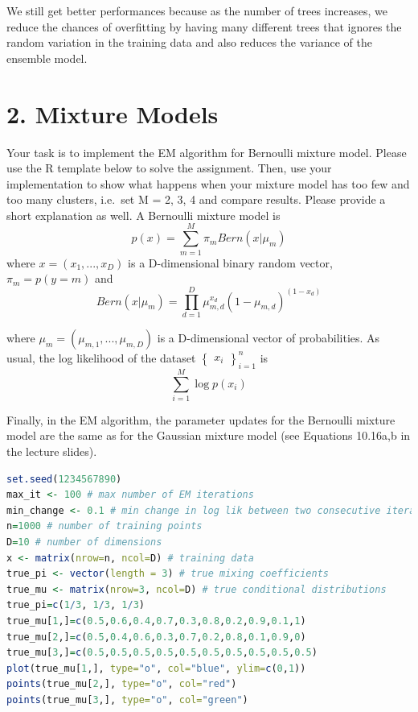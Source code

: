 \documentclass[
]{article}
\begin{document}
We still get better performances because as the number of trees
increases, we reduce the chances of overfitting by having many different
trees that ignores the random variation in the training data and also
reduces the variance of the ensemble model.

\hypertarget{mixture-models}{%
\section{2. Mixture Models}\label{mixture-models}}

Your task is to implement the EM algorithm for Bernoulli mixture model.
Please use the R template below to solve the assignment. Then, use your
implementation to show what happens when your mixture model has too few
and too many clusters, i.e.~set M = 2, 3, 4 and compare results. Please
provide a short explanation as well. A Bernoulli mixture model is
\[p(x) = \sum_{m=1}^{M}{\pi_m Bern(x|\mu_m)}\] where
\(x = (x_1,...,x_D)\) is a D-dimensional binary random vector,
\(\pi_m = p(y = m)\) and
\[Bern(x|\mu_m) = \prod_{d=1}^{D}{\mu_{m,d}^{x_d}(1-\mu_{m,d})^{(1-x_d)} }\]

where \(\mu_m = (\mu_{m,1} , . . . , \mu_{m,D} )\) is a D-dimensional
vector of probabilities. As usual, the log likelihood of the dataset
\(\begin{Bmatrix}x_i\end{Bmatrix}_{i=1}^{n}\) is
\[\sum_{i=1}^{M}\log p(x_i)\]

Finally, in the EM algorithm, the parameter updates for the Bernoulli
mixture model are the same as for the Gaussian mixture model (see
Equations 10.16a,b in the lecture slides).

\begin{lstlisting}[language=R]
set.seed(1234567890)
max_it <- 100 # max number of EM iterations
min_change <- 0.1 # min change in log lik between two consecutive iterations
n=1000 # number of training points
D=10 # number of dimensions
x <- matrix(nrow=n, ncol=D) # training data
true_pi <- vector(length = 3) # true mixing coefficients
true_mu <- matrix(nrow=3, ncol=D) # true conditional distributions
true_pi=c(1/3, 1/3, 1/3)
true_mu[1,]=c(0.5,0.6,0.4,0.7,0.3,0.8,0.2,0.9,0.1,1)
true_mu[2,]=c(0.5,0.4,0.6,0.3,0.7,0.2,0.8,0.1,0.9,0)
true_mu[3,]=c(0.5,0.5,0.5,0.5,0.5,0.5,0.5,0.5,0.5,0.5)
plot(true_mu[1,], type="o", col="blue", ylim=c(0,1))
points(true_mu[2,], type="o", col="red")
points(true_mu[3,], type="o", col="green")
\end{lstlisting}
\end{document}
